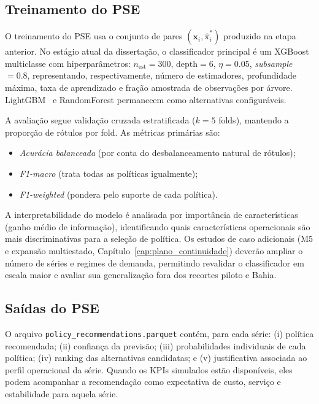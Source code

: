 \subsection{Treinamento do PSE}

O treinamento do PSE usa o conjunto de pares $(\mathbf{x}_i,\hat{\pi}^*_i)$ produzido na etapa anterior. No estágio atual da dissertação, o classificador principal é um XGBoost~\citep{ChenGuestrin2016XGBoost} multiclasse com hiperparâmetros: $n_{\text{est}}=300$, $\text{depth}=6$, $\eta=0.05$, \textit{subsample} $=0.8$, representando, respectivamente, número de estimadores, profundidade máxima, taxa de aprendizado e fração amostrada de observações por árvore. LightGBM~\citep{Ke2017LightGBM} e RandomForest permanecem como alternativas configuráveis.

A avaliação segue validação cruzada estratificada ($k=5$ folds), mantendo a proporção de rótulos por fold. As métricas primárias são:
\begin{itemize}
  \item \textit{Acurácia balanceada} (por conta do desbalanceamento natural de rótulos);
  \item \textit{F1-macro} (trata todas as políticas igualmente);
  \item \textit{F1-weighted} (pondera pelo suporte de cada política).
\end{itemize}

A interpretabilidade do modelo é analisada por importância de características (ganho médio de informação), identificando quais características operacionais são mais discriminativas para a seleção de política. Os estudos de caso adicionais (M5 e expansão multiestado, Capítulo~\ref{cap:plano_continuidade}) deverão ampliar o número de séries e regimes de demanda, permitindo revalidar o classificador em escala maior e avaliar sua generalização fora dos recortes piloto e Bahia.

\subsection{Saídas do PSE}

O arquivo \texttt{policy\_recommendations.parquet} contém, para cada série: (i) política recomendada; (ii) confiança da previsão; (iii) probabilidades individuais de cada política; (iv) ranking das alternativas candidatas; e (v) justificativa associada ao perfil operacional da série. Quando os KPIs simulados estão disponíveis, eles podem acompanhar a recomendação como expectativa de custo, serviço e estabilidade para aquela série.

